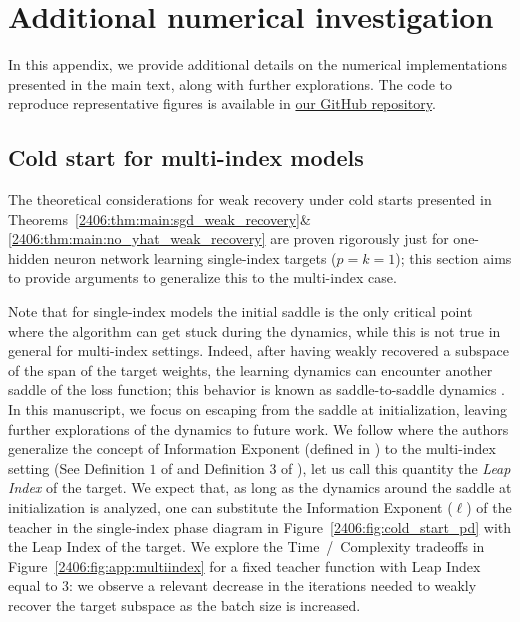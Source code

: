 \section{Additional numerical investigation}
\label{2406:sec:app:hyperparams}
In this appendix, we provide additional details on the numerical implementations presented in the main text, along with further explorations. The code to reproduce representative figures is available in \href{https://github.com/IdePHICS/batch-size-time-complexity-tradeoffs}{our GitHub repository}.

\subsection{Cold start for multi-index models} \label{2406:app:multiindex_model}
The theoretical considerations for weak recovery under cold starts presented in Theorems~\ref{2406:thm:main:sgd_weak_recovery}\&\ref{2406:thm:main:no_yhat_weak_recovery} are proven rigorously just for one-hidden neuron network learning single-index targets (\(p=k=1\)); this section aims to provide arguments to generalize this to the multi-index case. 

Note that for single-index models the initial saddle is the only critical point where the algorithm can get stuck during the dynamics, while this is not true in general for multi-index settings. Indeed, after having weakly recovered a subspace of the span of the target weights, the learning dynamics can encounter another saddle of the loss function; this behavior is known as saddle-to-saddle dynamics \cite{jacot2022saddle}. In this manuscript, we focus on escaping from the saddle at initialization, leaving further explorations of the dynamics to future work. We follow 
\cite{abbe2023sgd,dandi2023how} where the authors generalize the concept of Information Exponent (defined in ) to the multi-index setting (See Definition $1$ of \cite{abbe2023sgd} and Definition $3$ of \cite{dandi2023how}), let us call this quantity the \textit{Leap Index} of the target.
We expect that, as long as the dynamics around the saddle at initialization is analyzed, one can substitute the Information Exponent ($\ell$) of the teacher in the single-index phase diagram in Figure~\ref{2406:fig:cold_start_pd} with the Leap Index of the target. We explore the Time~/~Complexity tradeoffs in Figure~\ref{2406:fig:app:multiindex} for a fixed teacher function with Leap Index equal to $3$: we observe a relevant decrease in the iterations needed to weakly recover the target subspace as the batch size is increased.  

